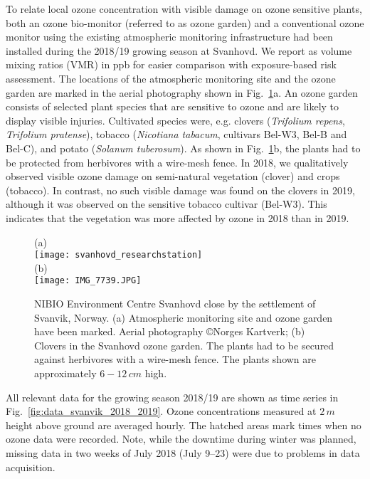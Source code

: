 \documentclass[bg, manuscript]{copernicus}
\begin{document}
To relate local ozone concentration \chem{[O_3]} with visible damage on ozone sensitive plants, both an ozone bio-monitor (referred to as ozone garden) and a conventional ozone monitor using the existing atmospheric monitoring infrastructure had been installed during the 2018/19 growing season at Svanhovd. We report \chem{[O_3]} as volume mixing ratios (VMR) in \unit{ppb} for easier comparison with exposure-based risk assessment. The locations of the atmospheric monitoring site and the ozone garden are marked in the aerial photography shown in Fig.~\ref{fig:svanhovd_research_station}a. An ozone garden consists of selected plant species that are sensitive to ozone and are likely to display visible injuries. Cultivated species were, e.g. clovers (\emph{Trifolium repens}, \emph{Trifolium pratense}), tobacco (\emph{Nicotiana tabacum}, cultivars Bel-W3, Bel-B and Bel-C), and potato (\emph{Solanum tuberosum}). As shown in Fig.~\ref{fig:svanhovd_research_station}b, the plants had to be protected from herbivores with a wire-mesh fence. In 2018, we qualitatively observed visible ozone damage on semi-natural vegetation (clover) and crops (tobacco). In contrast, no such visible damage was found on the clovers in 2019, although it was observed on the sensitive tobacco cultivar (Bel-W3). This indicates that the vegetation was more affected by ozone in 2018 than in 2019.

\begin{figure}[t]
  \centering
  (a)\\
  \texttt{[image: svanhovd\_researchstation]}\\
  (b)\\
  \texttt{[image: IMG\_7739.JPG]}
  \caption{NIBIO Environment Centre Svanhovd close by the settlement of Svanvik, Norway. (a) Atmospheric monitoring site and ozone garden have been marked. Aerial photography \copyright Norges Kartverk; (b) Clovers in the Svanhovd ozone garden. The plants had to be secured against herbivores with a wire-mesh fence. The plants shown are approximately $6-12\,\unit{cm}$ high.}
  \label{fig:svanhovd_research_station}
\end{figure}

All relevant data for the growing season 2018/19 are shown as time series in Fig.~\ref{fig:data_svanvik_2018_2019}. Ozone concentrations measured at $2\,\unit{m}$ height above ground are averaged hourly. The hatched areas mark times when no ozone data were recorded. Note, while the downtime during winter was planned, missing data in two weeks of July 2018 (July 9--23) were due to problems in data acquisition.
\end{document}
